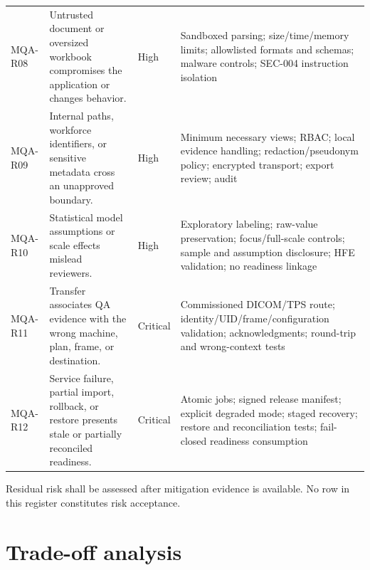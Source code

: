 \documentclass[11pt,letterpaper]{article}
\begin{document}
\begin{scriptsize}
\begin{longtable}{@{}L{0.10\textwidth}L{0.25\textwidth}L{0.12\textwidth}L{0.43\textwidth}@{}}
\addlinespace[2pt]
MQA-R08 & Untrusted document or oversized workbook compromises the application or changes behavior. & High & Sandboxed parsing; size/time/memory limits; allowlisted formats and schemas; malware controls; SEC-004 instruction isolation \\
\addlinespace[2pt]
MQA-R09 & Internal paths, workforce identifiers, or sensitive metadata cross an unapproved boundary. & High & Minimum necessary views; RBAC; local evidence handling; redaction/pseudonym policy; encrypted transport; export review; audit \\
\addlinespace[2pt]
MQA-R10 & Statistical model assumptions or scale effects mislead reviewers. & High & Exploratory labeling; raw-value preservation; focus/full-scale controls; sample and assumption disclosure; HFE validation; no readiness linkage \\
\addlinespace[2pt]
MQA-R11 & Transfer associates QA evidence with the wrong machine, plan, frame, or destination. & Critical & Commissioned DICOM/TPS route; identity/UID/frame/configuration validation; acknowledgments; round-trip and wrong-context tests \\
\addlinespace[2pt]
MQA-R12 & Service failure, partial import, rollback, or restore presents stale or partially reconciled readiness. & Critical & Atomic jobs; signed release manifest; explicit degraded mode; staged recovery; restore and reconciliation tests; fail-closed readiness consumption \\
\end{longtable}
\end{scriptsize}

Residual risk shall be assessed after mitigation evidence is available. No row in this register constitutes risk acceptance.

\section{Trade-off analysis}
\end{document}
